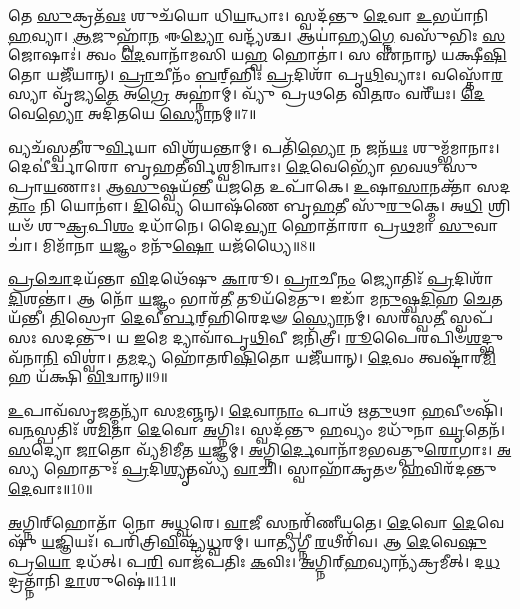 𑌤𑍇 \ul{𑌸𑍁}\-𑌕𑍍𑌰𑌤᳴\-\ul{𑌵𑌃} 𑌶𑍁𑌚᳴𑌯𑍋 𑌧𑌿\-\ul{𑌯}\-𑌨𑍍𑌧𑌾𑌃।
𑌸𑍍𑌵𑌦᳴𑌨𑍍𑌤𑍁 \ul{𑌦𑍇}\-𑌵𑌾 \ul{𑌉}\-𑌭𑌯𑌾᳴𑌨𑌿 \ul{𑌹}\-𑌵𑍍𑌯𑌾।
\-\ul{𑌆}\-𑌜𑍁𑌹𑍍𑌵𑌾᳴\-\ul{𑌨} 𑌈\-\ul{𑌡𑍍𑌯𑍋} 𑌵𑌨𑍍𑌦𑍍𑌯᳴𑌶𑍍𑌚।
𑌆𑌯𑌾॑𑌹𑍍𑌯\-\ul{𑌗𑍍𑌨𑍇} 𑌵𑌸𑍁᳴𑌭𑌿𑌃 \ul{𑌸}\-𑌜𑍋𑌷𑌾𑌃॑।
𑌤𑍍𑌵𑌂 \ul{𑌦𑍇}\-𑌵𑌾𑌨𑌾᳴𑌮𑌸𑌿 𑌯\-\ul{𑌹𑍍𑌵} 𑌹𑍋𑌤𑌾॑।
𑌸 𑌏᳴𑌨𑌾𑌨𑍍 𑌯𑌕𑍍𑌷𑍀\-\ul{𑌷𑌿}\-𑌤𑍋 𑌯𑌜𑍀᳴𑌯𑌾𑌨𑍍।
\-\ul{𑌪𑍍𑌰𑌾}\-𑌚𑍀𑌨𑌂᳴ \ul{𑌬}\-𑌰𑍍‌॒\mbox{}𑌹𑌿𑌃 \ul{𑌪𑍍𑌰}\-𑌦𑌿𑌶𑌾᳴ 𑌪𑍃\-\ul{𑌥𑌿}\-𑌵𑍍𑌯𑌾𑌃।
𑌵𑌸𑍍𑌤𑍋᳴\-\ul{𑌰}\-𑌸𑍍𑌯𑌾 𑌵𑍃᳴𑌜𑍍𑌯\-\ul{𑌤𑍇} 𑌅\-\ul{𑌗𑍍𑌰𑍇} 𑌅𑌹𑍍𑌨𑌾॑𑌮𑍍।
𑌵𑍍𑌯𑍁᳴ 𑌪𑍍𑌰𑌥𑌤𑍇 𑌵𑌿\-\ul{𑌤}\-𑌰𑌂 𑌵𑌰𑍀᳴𑌯𑌃।
\-\ul{𑌦𑍇}\-𑌵𑍇\-\ul{𑌭𑍍𑌯𑍋} 𑌅𑌦𑌿᳴𑌤𑌯𑍇 \ul{𑌸𑍍𑌯𑍋}\-𑌨𑌮𑍍॥7॥

𑌵𑍍𑌯𑌚᳴𑌸𑍍𑌵𑌤𑍀𑌰𑍁\-\ul{𑌰𑍍𑌵𑌿}\-𑌯𑌾 𑌵𑌿𑌶𑍍𑌰᳴𑌯𑌨𑍍𑌤𑌾𑌮𑍍।
𑌪𑌤𑌿᳴\-\ul{𑌭𑍍𑌯𑍋} 𑌨 𑌜𑌨᳴\-\ul{𑌯𑌃} 𑌶𑍁𑌮𑍍𑌭᳴𑌮𑌾𑌨𑌾𑌃।
𑌦𑍇𑌵𑍀॑𑌰𑍍𑌦𑍍𑌵𑌾𑌰𑍋 𑌬𑍃𑌹𑌤𑍀𑌰𑍍𑌵𑌿𑌶𑍍𑌵𑌮𑌿𑌨𑍍𑌵𑌾𑌃।
\-\ul{𑌦𑍇}\-𑌵𑍇𑌭𑍍𑌯𑍋᳴ 𑌭𑌵𑌥 𑌸𑍁𑌪𑍍𑌰𑌾\-\ul{𑌯}\-𑌣𑌾𑌃।
𑌆\-\ul{𑌸𑍁}\-𑌷𑍍𑌵𑌯᳴𑌨𑍍𑌤𑍀 𑌯\-\ul{𑌜}\-𑌤𑍇 𑌉𑌪𑌾᳴𑌕𑍇।
\-\ul{𑌉}\-𑌷𑌾\-\ul{𑌸𑌾}\-𑌨𑌕𑍍𑌤𑌾᳴ 𑌸𑌦\-\ul{𑌤𑌾𑌂} 𑌨𑌿 𑌯𑍋𑌨𑍗॑।
\-\ul{𑌦𑌿}\-𑌵𑍍𑌯𑍇 𑌯𑍋𑌷᳴𑌣𑍇 𑌬𑍃\-\ul{𑌹}\-𑌤𑍀 𑌸𑍁᳴\-\ul{𑌰𑍁}\-𑌕𑍍𑌮𑍇।
𑌅\-\ul{𑌧𑌿} 𑌶𑍍𑌰𑌿𑌯𑍞᳴ 𑌶𑍁\-\ul{𑌕𑍍𑌰}\-𑌪𑌿\-\ul{𑌶𑌂} 𑌦𑌧𑌾᳴𑌨𑍇।
𑌦𑍈\-\ul{𑌵𑍍𑌯𑌾} 𑌹𑍋𑌤𑌾᳴𑌰𑌾 𑌪𑍍𑌰\-\ul{𑌥}\-𑌮𑌾 \ul{𑌸𑍁}\-𑌵𑌾𑌚𑌾॑।
𑌮𑌿𑌮𑌾᳴𑌨𑌾 \ul{𑌯}\-𑌜𑍍𑌞𑌂 𑌮𑌨𑍁᳴\-\ul{𑌷𑍋} 𑌯𑌜᳴𑌧𑍍𑌯𑍈॥8॥

\-\ul{𑌪𑍍𑌰}\-\-\ul{𑌚𑍋}\-𑌦𑌯᳴𑌨𑍍𑌤𑌾 \ul{𑌵𑌿}\-𑌦𑌥𑍇᳴𑌷𑍁 \ul{𑌕𑌾}\-𑌰𑍂।
\-\ul{𑌪𑍍𑌰𑌾}\-𑌚𑍀\-\ul{𑌨𑌂} 𑌜𑍍𑌯𑍋𑌤𑌿𑌃᳴ \ul{𑌪𑍍𑌰}\-𑌦𑌿𑌶𑌾᳴ \ul{𑌦𑌿}\-𑌶𑌨𑍍𑌤𑌾॑।
𑌆 𑌨𑍋᳴ \ul{𑌯}\-𑌜𑍍𑌞𑌂 𑌭𑌾𑌰᳴\-\ul{𑌤𑍀} 𑌤𑍂𑌯᳴𑌮𑍇𑌤𑍁।
𑌇𑌡𑌾᳴ 𑌮\-\ul{𑌨𑍁}\-𑌷𑍍𑌵\-\ul{𑌦𑌿}\-𑌹 \ul{𑌚𑍇}\-𑌤𑌯᳴𑌨𑍍𑌤𑍀।
\-\ul{𑌤𑌿}\-𑌸𑍍𑌰𑍋 \ul{𑌦𑍇}\-𑌵𑍀\-\ul{𑌰𑍍𑌬}\-𑌰𑍍‌॒\mbox{}𑌹𑌿𑌰𑍇𑌦𑍟 \ul{𑌸𑍍𑌯𑍋}\-𑌨𑌮𑍍।
𑌸𑌰᳴𑌸𑍍𑌵\-\ul{𑌤𑍀} 𑌸𑍍𑌵𑌪᳴𑌸𑌃 𑌸𑌦𑌨𑍍𑌤𑍁।
𑌯 \ul{𑌇}\-𑌮𑍇 𑌦𑍍𑌯𑌾𑌵𑌾᳴𑌪𑍃\-\ul{𑌥𑌿}\-𑌵𑍀 𑌜𑌨𑌿᳴𑌤𑍍𑌰𑍀।
\-\ul{𑌰𑍂}\-𑌪𑍈𑌰𑌪𑌿𑍞᳴\-\ul{𑌶}\-𑌦𑍍𑌭𑍁𑌵᳴𑌨𑌾\-\ul{𑌨𑌿} 𑌵𑌿𑌶𑍍𑌵𑌾॑।
𑌤\-\ul{𑌮}\-𑌦𑍍𑌯 𑌹𑍋᳴𑌤𑌰𑌿\-\ul{𑌷𑌿}\-𑌤𑍋 𑌯𑌜𑍀᳴𑌯𑌾𑌨𑍍।
\-\ul{𑌦𑍇}\-𑌵𑌂 𑌤𑍍𑌵𑌷𑍍𑌟𑌾᳴𑌰\-\ul{𑌮𑌿}\-𑌹 𑌯᳴𑌕𑍍𑌷𑌿 \ul{𑌵𑌿}\-𑌦𑍍𑌵𑌾𑌨𑍍॥9॥

\-\ul{𑌉}\-𑌪𑌾𑌵᳴𑌸𑍃\-\ul{𑌜}\-𑌤𑍍𑌮𑌨𑍍𑌯𑌾᳴ 𑌸\-\ul{𑌮}\-𑌞𑍍𑌜𑌨𑍍।
\-\ul{𑌦𑍇}\-𑌵𑌾\-\ul{𑌨𑌾𑌂} 𑌪𑌾𑌥᳴ 𑌋\-\ul{𑌤𑍁}\-𑌥𑌾 \ul{𑌹}\-𑌵𑍀𑍞𑌷𑌿᳴।
𑌵\-\ul{𑌨}\-𑌸𑍍𑌪𑌤𑌿𑌃᳴ 𑌶\-\ul{𑌮𑌿}\-𑌤𑌾 \ul{𑌦𑍇}\-𑌵𑍋 \ul{𑌅}\-𑌗𑍍𑌨𑌿𑌃।
𑌸𑍍𑌵𑌦᳴𑌨𑍍𑌤𑍁 \ul{𑌹}\-𑌵𑍍𑌯𑌂 𑌮𑌧𑍁᳴𑌨𑌾 \ul{𑌘𑍃}\-𑌤𑍇𑌨᳴।
\-\ul{𑌸}\-𑌦𑍍𑌯𑍋 \ul{𑌜𑌾}\-𑌤𑍋 𑌵𑍍𑌯᳴𑌮𑌿𑌮𑍀𑌤 \ul{𑌯}\-𑌜𑍍𑌞𑌮𑍍।
\-\ul{𑌅}\-𑌗𑍍𑌨𑌿\-\ul{𑌰𑍍𑌦𑍇}\-𑌵𑌾𑌨𑌾᳴𑌮𑌭𑌵𑌤𑍍𑌪𑍁\-\ul{𑌰𑍋}\-𑌗𑌾𑌃।
\-\ul{𑌅}\-𑌸𑍍𑌯 𑌹𑍋𑌤𑍁𑌃᳴ \ul{𑌪𑍍𑌰}\-𑌦𑌿\-\ul{𑌶𑍍𑌯𑍃}\-𑌤𑌸𑍍𑌯᳴ \ul{𑌵𑌾}\-𑌚𑌿।
𑌸𑍍𑌵𑌾𑌹𑌾᳴𑌕𑍃𑌤𑍞 \ul{𑌹}\-𑌵𑌿𑌰᳴𑌦𑌨𑍍𑌤𑍁 \ul{𑌦𑍇}\-𑌵𑌾𑌃॥10॥\anuvakamend[\-\ul{𑌯}\-𑌜𑍍𑌞𑍈𑌃 \ul{𑌸𑍍𑌯𑍋}\-𑌨𑌂 𑌯𑌜᳴𑌧𑍍𑌯𑍈 \ul{𑌵𑌿}\-𑌦𑍍𑌵𑌾\-\ul{𑌨}\-𑌷𑍍𑌟𑍗 𑌚᳴]

\-\ul{𑌅}\-𑌗𑍍𑌨𑌿𑌰𑍍‌\mbox{}𑌹𑍋𑌤𑌾᳴ 𑌨𑍋 𑌅\-\ul{𑌧𑍍𑌵}\-𑌰𑍇।
\-\ul{𑌵𑌾}\-𑌜𑍀 𑌸𑌨𑍍𑌪𑌰𑌿᳴𑌣𑍀𑌯𑌤𑍇।
\-\ul{𑌦𑍇}\-𑌵𑍋 \ul{𑌦𑍇}\-𑌵𑍇𑌷𑍁᳴ \ul{𑌯}\-𑌜𑍍𑌞𑌿𑌯𑌃᳴।
𑌪𑌰𑌿᳴𑌤𑍍𑌰𑌿\-\ul{𑌵𑌿}\-𑌷𑍍𑌟𑍍𑌯᳴\-\ul{𑌧𑍍𑌵}\-𑌰𑌮𑍍।
𑌯𑌾\-\ul{𑌤𑍍𑌯}\-𑌗𑍍𑌨𑍀 \ul{𑌰}\-𑌥𑍀𑌰𑌿᳴𑌵।
𑌆 \ul{𑌦𑍇}\-𑌵𑍇\-\ul{𑌷𑍁} 𑌪𑍍𑌰\-\ul{𑌯𑍋} 𑌦𑌧᳴𑌤𑍍।
𑌪\-\ul{𑌰𑌿} 𑌵𑌾𑌜᳴𑌪𑌤𑌿𑌃 \ul{𑌕}\-𑌵𑌿𑌃।
\-\ul{𑌅}\-𑌗𑍍𑌨𑌿𑌰𑍍‌\mbox{}\-\ul{𑌹}\-𑌵𑍍𑌯𑌾𑌨𑍍𑌯᳴𑌕𑍍𑌰𑌮𑍀𑌤𑍍।
𑌦\-\ul{𑌧}\-𑌦𑍍𑌰𑌤𑍍𑌨𑌾᳴𑌨𑌿 \ul{𑌦𑌾}\-𑌶𑍁𑌷𑍇॑॥11॥\anuvakamend[\-\ul{𑌅}\-𑌗𑍍𑌨𑌿𑌰𑍍‌\mbox{}𑌹𑍋𑌤𑌾᳴ \ul{𑌨𑍋} 𑌨𑌵᳴]

